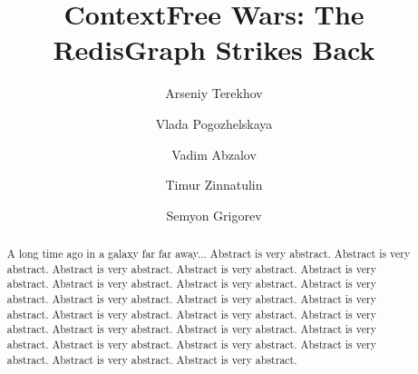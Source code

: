 \documentclass[sigconf,edbt]{acmart-edbt2021}
\begin{document}
\title{ContextFree Wars: The RedisGraph Strikes Back}
  


\author{Arseniy Terekhov}

\author{Vlada Pogozhelskaya}

\author{Vadim Abzalov}

\author{Timur Zinnatulin}

\author{Semyon Grigorev}

\renewcommand{\shortauthors}{Arseniy Terekhov et al.}


\begin{abstract}
A long time ago in a galaxy far far away...
Abstract is very abstract. Abstract is very abstract. Abstract is very abstract. Abstract is very abstract. Abstract is very abstract. Abstract is very abstract. Abstract is very abstract. Abstract is very abstract. Abstract is very abstract. Abstract is very abstract. Abstract is very abstract. Abstract is very abstract. Abstract is very abstract. Abstract is very abstract. Abstract is very abstract. Abstract is very abstract. Abstract is very abstract. Abstract is very abstract. Abstract is very abstract. Abstract is very abstract. Abstract is very abstract. Abstract is very abstract. 
\end{abstract}
\end{document}
